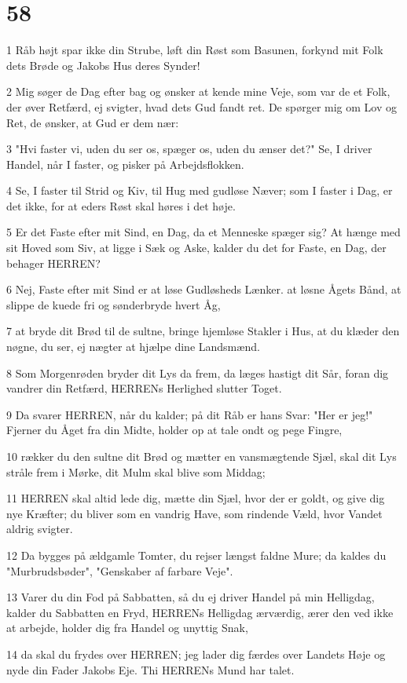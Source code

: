 \chapter{58}

\par 1 Råb højt spar ikke din Strube, løft din Røst som Basunen, forkynd mit Folk dets Brøde og Jakobs Hus deres Synder!
\par 2 Mig søger de Dag efter bag og ønsker at kende mine Veje, som var de et Folk, der øver Retfærd, ej svigter, hvad dets Gud fandt ret. De spørger mig om Lov og Ret, de ønsker, at Gud er dem nær:
\par 3 "Hvi faster vi, uden du ser os, spæger os, uden du ænser det?" Se, I driver Handel, når I faster, og pisker på Arbejdsflokken.
\par 4 Se, I faster til Strid og Kiv, til Hug med gudløse Næver; som I faster i Dag, er det ikke, for at eders Røst skal høres i det høje.
\par 5 Er det Faste efter mit Sind, en Dag, da et Menneske spæger sig? At hænge med sit Hoved som Siv, at ligge i Sæk og Aske, kalder du det for Faste, en Dag, der behager HERREN?
\par 6 Nej, Faste efter mit Sind er at løse Gudløsheds Lænker. at løsne Ågets Bånd, at slippe de kuede fri og sønderbryde hvert Åg,
\par 7 at bryde dit Brød til de sultne, bringe hjemløse Stakler i Hus, at du klæder den nøgne, du ser, ej nægter at hjælpe dine Landsmænd.
\par 8 Som Morgenrøden bryder dit Lys da frem, da læges hastigt dit Sår, foran dig vandrer din Retfærd, HERRENs Herlighed slutter Toget.
\par 9 Da svarer HERREN, når du kalder; på dit Råb er hans Svar: "Her er jeg!" Fjerner du Åget fra din Midte, holder op at tale ondt og pege Fingre,
\par 10 rækker du den sultne dit Brød og mætter en vansmægtende Sjæl, skal dit Lys stråle frem i Mørke, dit Mulm skal blive som Middag;
\par 11 HERREN skal altid lede dig, mætte din Sjæl, hvor der er goldt, og give dig nye Kræfter; du bliver som en vandrig Have, som rindende Væld, hvor Vandet aldrig svigter.
\par 12 Da bygges på ældgamle Tomter, du rejser længst faldne Mure; da kaldes du "Murbrudsbøder", "Genskaber af farbare Veje".
\par 13 Varer du din Fod på Sabbatten, så du ej driver Handel på min Helligdag, kalder du Sabbatten en Fryd, HERRENs Helligdag ærværdig, ærer den ved ikke at arbejde, holder dig fra Handel og unyttig Snak,
\par 14 da skal du frydes over HERREN; jeg lader dig færdes over Landets Høje og nyde din Fader Jakobs Eje. Thi HERRENs Mund har talet.

